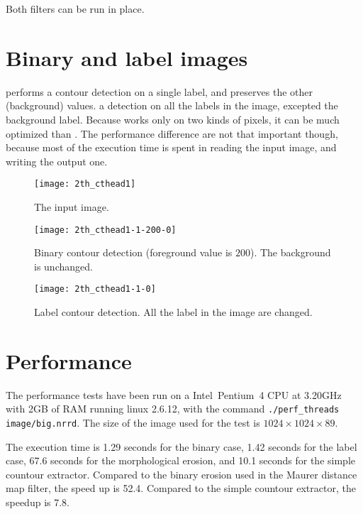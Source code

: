 \documentclass{InsightArticle}
\begin{document}
Both filters can be run in place.

\section{Binary and label images}  performs a contour detection on a single label, and preserves the other (background) values.  a detection on all the labels in the image, excepted the background label. Because  works only on two kinds of pixels, it can be much optimized than . The performance difference are not that important though, because most of the execution time is spent in reading the input image, and writing the output one.

\begin{figure}[htbp]
\centering
\texttt{[image: 2th\_cthead1]}
\caption{The input image.\label{cthead1}}
\end{figure}

\begin{figure}[htbp]
\centering
\texttt{[image: 2th\_cthead1-1-200-0]}
\caption{Binary contour detection (foreground value is $200$). The background is unchanged.\label{cthead1-bin}}
\end{figure}

\begin{figure}[htbp]
\centering
\texttt{[image: 2th\_cthead1-1-0]}
\caption{Label contour detection. All the label in the image are changed.\label{cthead1-label}}
\end{figure}

\section{Performance}

The performance tests have been run on a Intel\circledR~Pentium\circledR~4 CPU at 3.20GHz with 2GB of RAM running linux 2.6.12, with the command \verb$./perf_threads image/big.nrrd$. The size of the image used for the test is $1024 \times 1024 \times 89$.

The execution time is 1.29 seconds for the binary case, 1.42 seconds for the label case, 67.6 seconds for the morphological erosion, and 10.1 seconds for the simple countour extractor. Compared to the binary erosion used in the Maurer distance map filter, the speed up is 52.4. Compared to the simple countour extractor, the speedup is 7.8.
\end{document}
